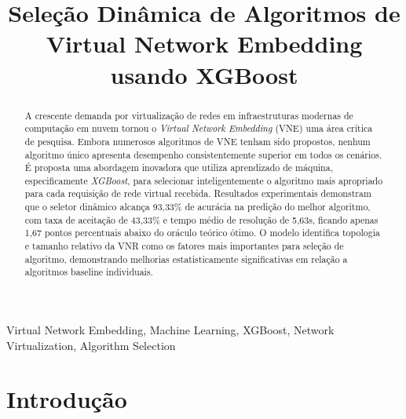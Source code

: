 \documentclass[conference]{IEEEtran}
\begin{document}
\title{Seleção Dinâmica de Algoritmos de Virtual Network Embedding usando XGBoost}

\author{
\and
{}
}

\maketitle

\begin{abstract}
A crescente demanda por virtualização de redes em infraestruturas modernas de computação em nuvem tornou o \textit{Virtual Network Embedding} (VNE) uma área crítica de pesquisa. Embora numerosos algoritmos de VNE tenham sido propostos, nenhum algoritmo único apresenta desempenho consistentemente superior em todos os cenários. É proposta uma abordagem inovadora que utiliza aprendizado de máquina, especificamente \textit{XGBoost}, para selecionar inteligentemente o algoritmo mais apropriado para cada requisição de rede virtual recebida. Resultados experimentais demonstram que o seletor dinâmico alcança 93,33\% de acurácia na predição do melhor algoritmo, com taxa de aceitação de 43,33\% e tempo médio de resolução de 5,63s, ficando apenas 1,67 pontos percentuais abaixo do oráculo teórico ótimo. O modelo identifica topologia e tamanho relativo da VNR como os fatores mais importantes para seleção de algoritmo, demonstrando melhorias estatisticamente significativas em relação a algoritmos baseline individuais.
\end{abstract}

\begin{IEEEkeywords}
Virtual Network Embedding, Machine Learning, XGBoost, Network Virtualization, Algorithm Selection
\end{IEEEkeywords}


\section{Introdução}
\label{sec:Intro}
\end{document}
